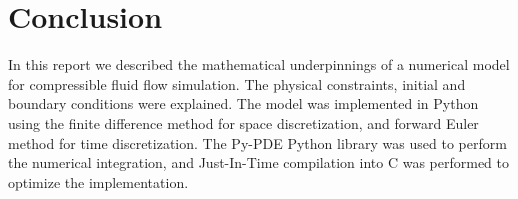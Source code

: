 \section{Conclusion} \label{section: conclusion}
In this report we described the mathematical underpinnings of a numerical model for compressible fluid flow simulation. The physical constraints, initial and boundary conditions were explained. The model was implemented in Python using the finite difference method for space discretization, and forward Euler method for time discretization. The Py-PDE Python library was used to perform the numerical integration, and Just-In-Time compilation into C was performed to optimize the implementation.  